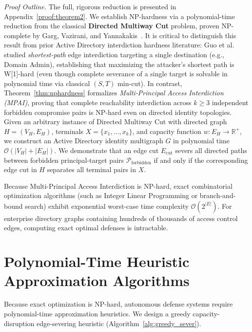 \noindent\textit{Proof Outline.} The full, rigorous reduction is presented in Appendix~\ref{proof:theorem2}. We establish NP-hardness via a polynomial-time reduction from the classical \textbf{Directed Multiway Cut} problem, proven NP-complete by Garg, Vazirani, and Yannakakis~\cite{garg1994multiway}. It is critical to distinguish this result from prior Active Directory interdiction hardness literature: Guo et al.~\cite{guo2022practical,guo2023scalable} studied \textit{shortest-path} edge interdiction targeting a single destination (e.g., Domain Admin), establishing that maximizing the attacker's shortest path is W[1]-hard (even though complete severance of a single target is solvable in polynomial time via classical $(S, T)$ min-cut). In contrast, Theorem~\ref{thm:nphardness} formalizes \textit{Multi-Principal Access Interdiction (MPAI)}, proving that complete reachability interdiction across $k \ge 3$ independent forbidden compromise pairs is NP-hard even on directed identity topologies. Given an arbitrary instance of Directed Multiway Cut with directed graph $H = (V_H, E_H)$, terminals $X = \{x_1, \dots, x_k\}$, and capacity function $w: E_H \to \mathbb{R}^+$, we construct an Active Directory identity multigraph $G$ in polynomial time $\mathcal{O}(|V_H| + |E_H|)$. We demonstrate that an edge cut $E_{\text{cut}}$ severs all directed paths between forbidden principal-target pairs $\mathcal{P}_{\text{forbidden}}$ if and only if the corresponding edge cut in $H$ separates all terminal pairs in $X$.

\begin{corollary}
Because Multi-Principal Access Interdiction is NP-hard, exact combinatorial optimization algorithms (such as Integer Linear Programming or branch-and-bound search) exhibit exponential worst-case time complexity $\mathcal{O}(2^{|E|})$. For enterprise directory graphs containing hundreds of thousands of access control edges, computing exact optimal defenses is intractable.
\end{corollary}

\section{Polynomial-Time Heuristic Approximation Algorithms}
Because exact optimization is NP-hard, autonomous defense systems require polynomial-time approximation heuristics. We design a greedy capacity-disruption edge-severing heuristic (Algorithm~\ref{alg:greedy_sever}).

